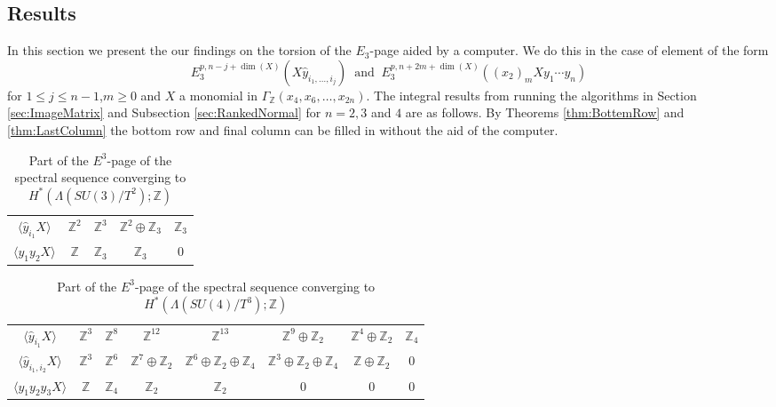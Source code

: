 \documentclass{article}
\theoremstyle{plain}
\theoremstyle{definition}
\numberwithin{thm}{section}
\begin{document}
							
		\subsection{Results}\label{sec:results}
			
			In this section we present the our findings on the torsion of the $E_3$-page aided by a computer.
			We do this in the case of element of the form
			\begin{equation}\label{eq:Positions}
				E_3^{p,n-j+\dim(X)}(X\hat{y}_{i_1,\dots,i_j}) \;\; \text{and} \;\; E_3^{p,n+2m+\dim(X)}({(x_2)}_mXy_1\cdots y_n)
			\end{equation}
			for $1\leq j \leq n-1$,$m\geq 0$ and $X$ a monomial in $\Gamma_{\mathbb{Z}}(x_4,x_6,\dots,x_{2n})$.	
			The integral results from running the algorithms in Section \ref{sec:ImageMatrix} and Subsection \ref{sec:RankedNormal} for $n=2,3$ and $4$ are as follows.
			By Theorems \ref{thm:BottemRow} and \ref{thm:LastColumn} the bottom row and final column can be filled in without the aid of the computer.
			
			\begin{table}[ht]
			\centering
			\caption{Part of the $E^3$-page of the spectral sequence converging to $H^*(\Lambda(SU(3)/T^2);\mathbb{Z})$}
			\begin{tabular}{c|cccc}
			$\langle \hat{y}_{i_1}X \rangle$ 	& $\mathbb{Z}^2$	& $\mathbb{Z}^3$ & $\mathbb{Z}^2\oplus\mathbb{Z}_3$ & $\mathbb{Z}_3$ \\
			$\langle y_1y_2X \rangle$ 				&	$\mathbb{Z}$ 		& $\mathbb{Z}_3$ & $\mathbb{Z}_3$ 									&    $0$
			\end{tabular}
			\end{table}
			
			\begin{table}[ht]
			\centering
			\caption{Part of the $E^3$-page of the spectral sequence converging to $H^*(\Lambda(SU(4)/T^3);\mathbb{Z})$}
			\begin{tabular}{c|ccccccc}
			$\langle \hat{y}_{i_1}X \rangle$			& $\mathbb{Z}^3$ & $\mathbb{Z}^8$ & $\mathbb{Z}^{12}$ & $\mathbb{Z}^{13}$ & $\mathbb{Z}^9\oplus\mathbb{Z}_2$
																						& $\mathbb{Z}^4\oplus\mathbb{Z}_2$ & $\mathbb{Z}_4$ \\
			$\langle \hat{y}_{i_1,i_2}X \rangle$	& $\mathbb{Z}^3$ & $\mathbb{Z}^6$ & $\mathbb{Z}^7\oplus\mathbb{Z}_2$ & $\mathbb{Z}^6\oplus\mathbb{Z}_2\oplus\mathbb{Z}_4$ 
																						& $\mathbb{Z}^3\oplus\mathbb{Z}_2\oplus\mathbb{Z}_4$ & $\mathbb{Z}\oplus\mathbb{Z}_2$ & 0 \\
			$\langle y_1y_2y_3X \rangle$					& $\mathbb{Z}$ 	 & $\mathbb{Z}_4$ & $\mathbb{Z}_2$ & $\mathbb{Z}_2$ & $0$ & $0$ & $0$
			\end{tabular}
			\end{table}
			
\end{document}

